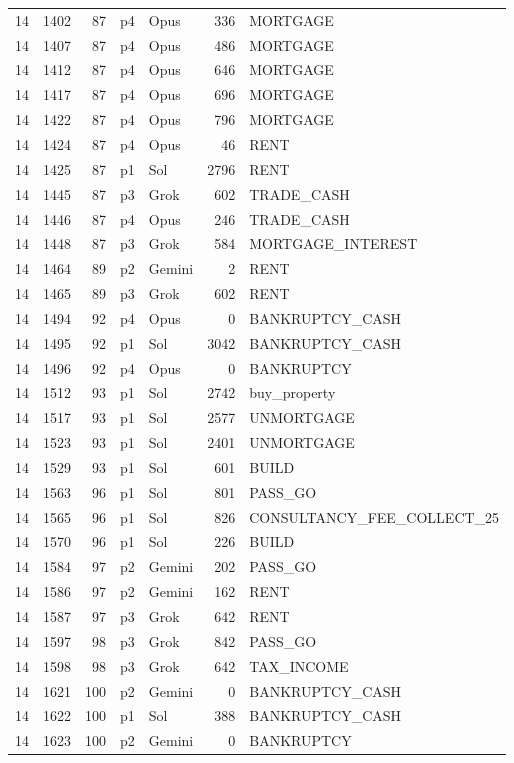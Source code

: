 \begin{longtable}{r r r l l r >{\ttfamily}l}
14 & 1402 & 87 & p4 & Opus & 336 & MORTGAGE \\
14 & 1407 & 87 & p4 & Opus & 486 & MORTGAGE \\
14 & 1412 & 87 & p4 & Opus & 646 & MORTGAGE \\
14 & 1417 & 87 & p4 & Opus & 696 & MORTGAGE \\
14 & 1422 & 87 & p4 & Opus & 796 & MORTGAGE \\
14 & 1424 & 87 & p4 & Opus & 46 & RENT \\
14 & 1425 & 87 & p1 & Sol & 2796 & RENT \\
14 & 1445 & 87 & p3 & Grok & 602 & TRADE\_CASH \\
14 & 1446 & 87 & p4 & Opus & 246 & TRADE\_CASH \\
14 & 1448 & 87 & p3 & Grok & 584 & MORTGAGE\_INTEREST \\
14 & 1464 & 89 & p2 & Gemini & 2 & RENT \\
14 & 1465 & 89 & p3 & Grok & 602 & RENT \\
14 & 1494 & 92 & p4 & Opus & 0 & BANKRUPTCY\_CASH \\
14 & 1495 & 92 & p1 & Sol & 3042 & BANKRUPTCY\_CASH \\
14 & 1496 & 92 & p4 & Opus & 0 & BANKRUPTCY \\
14 & 1512 & 93 & p1 & Sol & 2742 & buy\_property \\
14 & 1517 & 93 & p1 & Sol & 2577 & UNMORTGAGE \\
14 & 1523 & 93 & p1 & Sol & 2401 & UNMORTGAGE \\
14 & 1529 & 93 & p1 & Sol & 601 & BUILD \\
14 & 1563 & 96 & p1 & Sol & 801 & PASS\_GO \\
14 & 1565 & 96 & p1 & Sol & 826 & CONSULTANCY\_FEE\_COLLECT\_25 \\
14 & 1570 & 96 & p1 & Sol & 226 & BUILD \\
14 & 1584 & 97 & p2 & Gemini & 202 & PASS\_GO \\
14 & 1586 & 97 & p2 & Gemini & 162 & RENT \\
14 & 1587 & 97 & p3 & Grok & 642 & RENT \\
14 & 1597 & 98 & p3 & Grok & 842 & PASS\_GO \\
14 & 1598 & 98 & p3 & Grok & 642 & TAX\_INCOME \\
14 & 1621 & 100 & p2 & Gemini & 0 & BANKRUPTCY\_CASH \\
14 & 1622 & 100 & p1 & Sol & 388 & BANKRUPTCY\_CASH \\
14 & 1623 & 100 & p2 & Gemini & 0 & BANKRUPTCY \\

\end{longtable}
